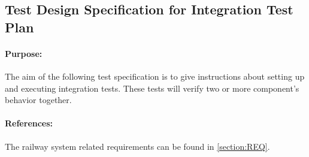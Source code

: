 \subsection{Test Design Specification for Integration Test Plan}

\paragraph{Purpose:} The aim of the following test specification is to give instructions about setting up and executing integration tests. These tests will verify two or more component's behavior together.
\paragraph{References:} The railway system related requirements can be found in \autoref{section:REQ}.


